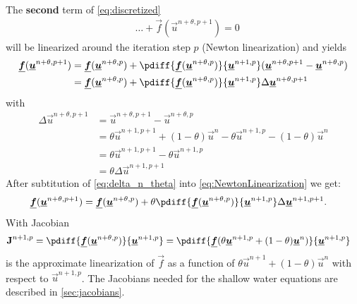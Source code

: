 The \textbf{second} term of \autoref{eq:discretized}
\begin{align}
    &\ldots +
    \vec{f} \left( \vec{u}^{n+\theta, p+1} \right) = 0
    \label{eq:second_term}
\end{align}
%
will be linearized around the iteration step $p$ (Newton linearization) and yields
\begin{align}
    \vec{f}( \vec{u}^{n+\theta, p+1} ) & = \vec{f}( \vec{u}^{n+\theta, p} ) + \pdiff{\vec{f}(\vec{u}^{n+\theta,p})}{\vec{u}^{n+1,p}} (\vec{u}^{n+\theta,p+1} - \vec{u}^{n+\theta,p})
    \\
    & = \vec{f}( \vec{u}^{n+\theta, p} ) + \pdiff{\vec{f}(\vec{u}^{n+\theta,p})}{\vec{u}^{n+1,p}} \Delta\vec{u}^{n+\theta,p+1} \label{eq:NewtonLinearization}
\end{align}
with
\begin{align}
    \Delta \vec{u}^{n+\theta, p+1} & = \vec{u}^{n+\theta, p+1} - \vec{u}^{n+\theta, p}
    \\
    & = \theta \vec{u}^{n+1, p+1} + (1-\theta) \vec{u}^{n} - \theta \vec{u}^{n+1, p} - (1-\theta) \vec{u}^{n}
    \\
    & = \theta \vec{u}^{n+1, p+1} - \theta \vec{u}^{n+1, p}
    \\
    &= \theta \Delta \vec{u}^{n+1, p+1} \label{eq:delta_n_theta}
\end{align}
After subtitution of \autoref{eq:delta_n_theta} into \autoref{eq:NewtonLinearization} we get:
\begin{align}
    \vec{f}( \vec{u}^{n+\theta, p+1} ) & = \vec{f}( \vec{u}^{n+\theta, p} ) + \theta \pdiff{\vec{f}(\vec{u}^{n+\theta,p})}{\vec{u}^{n+1,p}} \Delta \vec{u}^{n+1, p+1}.
\end{align}
With Jacobian
\begin{align}
    \mat{J}^{n+1,p} & = \pdiff{\vec{f}(\vec{u}^{n+\theta,p})}{\vec{u}^{n+1,p}}
     = \pdiff{\vec{f}(\theta \vec{u}^{n+1,p} + (1 - \theta) \vec{u}^{n})}{\vec{u}^{n+1,p}}
\end{align}
is the approximate linearization of $\vec{f}$ as a
function of $\theta \vec{u}^{n+1} + (1-\theta)\vec{u}^{n}$ with respect to $\vec{u}^{n+1, p}$.
The Jacobians needed for the shallow water equations are described in \autoref{sec:jacobians}.


